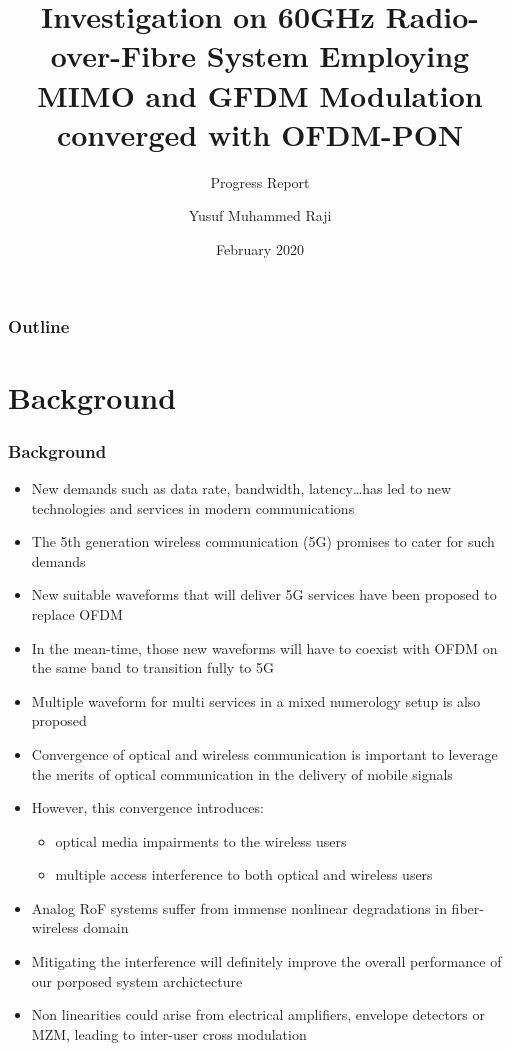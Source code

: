 \documentclass[t]{beamer}
\title[60GHz RoF]{Investigation on 60GHz Radio-over-Fibre System Employing MIMO and GFDM Modulation converged with OFDM-PON}
\subtitle{Progress Report}
\author{Yusuf Muhammed Raji}
\institute[MMU]{Multimedia University}
\date[Feb 2020]{February 2020}
\begin{document}
\begin{frame}
    \begin{titlepage}
        
    \end{titlepage}    
\end{frame}

\begin{frame}
    \frametitle{Outline}
    \tableofcontents
    
\end{frame}

\section{Background}

\begin{frame}[allowframebreaks]
    \frametitle{Background}
    \begin{itemize}
        \item New demands such as data rate, bandwidth, latency\dots has led to new technologies and services in modern communications 
        \item The 5th generation wireless communication (5G) promises to cater for such demands~\cite{Sarmiento2018,Eldessoki2017}
        \item New suitable waveforms that will deliver 5G services have been proposed to replace OFDM~\cite{Delmade2017,Tipan2018,Browning2017}
        \item In the mean-time, those new waveforms will have to coexist with OFDM on the same band to transition fully to 5G
        \item Multiple waveform for multi services in a mixed numerology setup is also proposed~\cite{Eldessoki2017}
        \item Convergence of optical and wireless communication is important to leverage the merits of optical communication in the delivery of mobile signals~\cite{Tipan2018,Chang2017,Dat2018,Browning2017}
        \item However, this convergence introduces:
        \begin{itemize}
            \item optical media impairments to the wireless users
            \item multiple access interference to both optical and wireless users
        \end{itemize}   
        \item Analog RoF systems suffer from immense nonlinear degradations in fiber-wireless domain
        \item Mitigating the interference will definitely improve the overall performance of our porposed system archictecture
        \item Non linearities could arise from electrical amplifiers, envelope detectors or MZM, leading to inter-user cross modulation       
    \end{itemize}
    
    
\end{frame}
\end{document}
